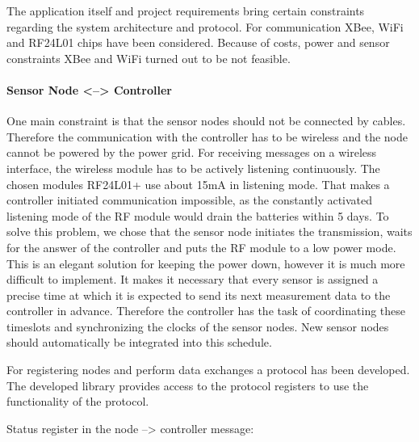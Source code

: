 The application itself and project requirements bring certain constraints regarding the system architecture and protocol. For communication XBee, WiFi and RF24L01 chips have been considered. Because of costs, power and sensor constraints XBee and WiFi turned out to be not feasible.

\paragraph{Sensor Node <--> Controller}
One main constraint is that the sensor nodes should not be connected by cables. Therefore the communication with the controller has to be wireless and the node cannot be powered by the power grid.
For receiving messages on a wireless interface, the wireless module has to be actively listening continuously. The chosen modules RF24L01+ use about 15mA in listening mode. That makes a controller initiated communication impossible, as the constantly activated listening mode of the RF module would drain the batteries within 5 days.
To solve this problem, we chose that the sensor node initiates the transmission, waits for the answer of the controller and puts the RF module to a low power mode. This is an elegant solution for keeping the power down, however it is much more difficult to implement. It makes it necessary that every sensor is assigned a precise time at which it is expected to send its next measurement data to the controller in advance. Therefore the controller has the task of coordinating these timeslots and synchronizing the clocks of the sensor nodes. New sensor nodes should automatically be integrated into this schedule.


For registering nodes and perform data exchanges a protocol has been developed. The developed library provides access to the protocol registers to use the functionality of the protocol.


Status register in the node --> controller message:

